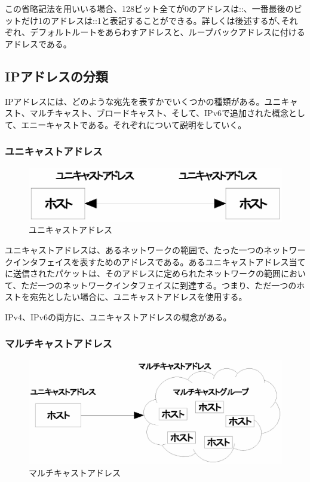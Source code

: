 この省略記法を用いいる場合、128ビット全てが0のアドレスは::、一番最後のビットだけ1のアドレスは::1と表記することができる。詳しくは後述するが､それぞれ、デフォルトルートをあらわすアドレスと、ループバックアドレスに付けるアドレスである。

\subsection{IPアドレスの分類}

IPアドレスには、どのような宛先を表すかでいくつかの種類がある。ユニキャスト、マルチキャスト、ブロードキャスト、そして、IPv6で追加された概念として、エニーキャストである。それぞれについて説明をしていく。

\subsubsection{ユニキャストアドレス}

\begin{figure}[htbp]
	\includegraphics[width=12cm,clip]{draw/unicast.eps}
	\caption{ユニキャストアドレス}
	\label{fig:unicast}
\end{figure}

ユニキャストアドレスは、あるネットワークの範囲で、たった一つのネットワークインタフェイスを表すためのアドレスである。あるユニキャストアドレス当てに送信されたパケットは、そのアドレスに定められたネットワークの範囲において、ただ一つのネットワークインタフェイスに到達する。つまり、ただ一つのホストを宛先としたい場合に、ユニキャストアドレスを使用する。

IPv4、IPv6の両方に、ユニキャストアドレスの概念がある。


\subsubsection{マルチキャストアドレス}
\begin{figure}[htbp]
	\includegraphics[width=12cm,clip]{draw/multicast.eps}
	\caption{マルチキャストアドレス}
	\label{fig:multicast}
\end{figure}

